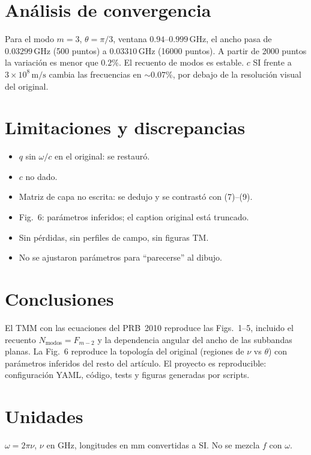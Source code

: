 \documentclass[11pt,a4paper]{article}
\begin{document}
\section{Análisis de convergencia}

Para el modo $m=3$, $\theta=\pi/3$, ventana $0.94$--$0.999\,\mathrm{GHz}$,
el ancho pasa de $0.03299\,\mathrm{GHz}$ (500 puntos) a $0.03310\,\mathrm{GHz}$
(16000 puntos). A partir de 2000 puntos la variación es menor que $0.2\%$.
El recuento de modos es estable. $c$ SI frente a $3\times 10^8\,\mathrm{m/s}$
cambia las frecuencias en $\sim 0.07\%$, por debajo de la resolución visual del original.

\section{Limitaciones y discrepancias}

\begin{itemize}
\item $q$ sin $\omega/c$ en el original: se restauró.
\item $c$ no dado.
\item Matriz de capa no escrita: se dedujo y se contrastó con (7)--(9).
\item Fig.~6: parámetros inferidos; el caption original está truncado.
\item Sin pérdidas, sin perfiles de campo, sin figuras TM.
\item No se ajustaron parámetros para ``parecerse'' al dibujo.
\end{itemize}

\section{Conclusiones}

El TMM con las ecuaciones del PRB~2010 reproduce las Figs.~1--5, incluido el recuento
$N_{\mathrm{modos}}=F_{m-2}$ y la dependencia angular del ancho de las subbandas planas.
La Fig.~6 reproduce la topología del original (regiones de $\nu$ vs $\theta$) con
parámetros inferidos del resto del artículo.
El proyecto es reproducible: configuración YAML, código, tests y figuras generadas
por scripts.

\appendix
\section{Unidades}
$\omega=2\pi\nu$, $\nu$ en GHz, longitudes en mm convertidas a SI.
No se mezcla $f$ con $\omega$.
\end{document}
